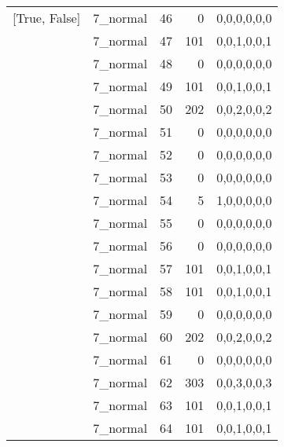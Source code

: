 \begin{tabular}{llrrl}
 [True, False]   & 7\_normal            &            46 &                     0 & 0,0,0,0,0,0   \\
 [True, False]   & 7\_normal            &            47 &                   101 & 0,0,1,0,0,1   \\
 [True, False]   & 7\_normal            &            48 &                     0 & 0,0,0,0,0,0   \\
 [True, False]   & 7\_normal            &            49 &                   101 & 0,0,1,0,0,1   \\
 [True, False]   & 7\_normal            &            50 &                   202 & 0,0,2,0,0,2   \\
 [True, False]   & 7\_normal            &            51 &                     0 & 0,0,0,0,0,0   \\
 [True, False]   & 7\_normal            &            52 &                     0 & 0,0,0,0,0,0   \\
 [True, False]   & 7\_normal            &            53 &                     0 & 0,0,0,0,0,0   \\
 [True, False]   & 7\_normal            &            54 &                     5 & 1,0,0,0,0,0   \\
 [True, False]   & 7\_normal            &            55 &                     0 & 0,0,0,0,0,0   \\
 [True, False]   & 7\_normal            &            56 &                     0 & 0,0,0,0,0,0   \\
 [True, False]   & 7\_normal            &            57 &                   101 & 0,0,1,0,0,1   \\
 [True, False]   & 7\_normal            &            58 &                   101 & 0,0,1,0,0,1   \\
 [True, False]   & 7\_normal            &            59 &                     0 & 0,0,0,0,0,0   \\
 [True, False]   & 7\_normal            &            60 &                   202 & 0,0,2,0,0,2   \\
 [True, False]   & 7\_normal            &            61 &                     0 & 0,0,0,0,0,0   \\
 [True, False]   & 7\_normal            &            62 &                   303 & 0,0,3,0,0,3   \\
 [True, False]   & 7\_normal            &            63 &                   101 & 0,0,1,0,0,1   \\
 [True, False]   & 7\_normal            &            64 &                   101 & 0,0,1,0,0,1   \\

\end{tabular}
